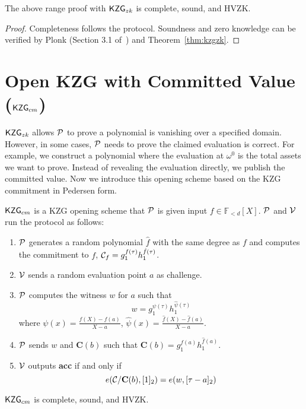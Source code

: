\begin{theorem}
The above range proof with $\mathsf{KZG}_{zk}$ is complete, sound, and HVZK.
\end{theorem}
\begin{proof}
Completeness follows the protocol. Soundness and zero knowledge can be verified by Plonk (Section 3.1 of~\cite{plonk}) and Theorem~\ref{thm:kzgzk}.
\end{proof}

\section{Open KZG with Committed Value ($\kzgcm$)}
\label{sec:kzgOpenComm}
$\mathsf{KZG}_{zk}$ allows $\mathcal{P}$ to prove a polynomial is vanishing over a specified domain. However, in some cases, $\mathcal{P}$ needs to prove the claimed evaluation is correct. For example, we construct a polynomial where the evaluation at $\omega^0$ is the total assets we want to prove. Instead of revealing the evaluation directly, we publish the committed value. Now we introduce this opening scheme based on the KZG commitment in Pedersen form.
\begin{definition}[$\kzgcm$]
$\kzgcm$ is a KZG opening scheme that $\mathcal{P}$ is given input $f\in\mathbb{F}_{<d}[X]$. $\mathcal{P}$ and $\mathcal{V}$ run the protocol as follows:
\begin{enumerate}
    \item $\mathcal{P}$ generates a random polynomial $\hat{f}$ with the same degree as $f$ and computes the commitment to $f$, $\mathcal{C}_f=g_1^{f(\tau)}h_1^{\hat{f}(\tau)}$.
    \item $\mathcal{V}$ sends a random evaluation point $a$ as challenge.
    \item $\mathcal{P}$ computes the witness $w$ for $a$ such that
    \[ w=g_1^{\psi(\tau)}h_1^{\hat\psi(\tau)} \]
    where $\psi(x)=\frac{f(X)-f(a)}{X-a}$, $\hat\psi(x)=\frac{\hat{f}(X)-\hat{f}(a)}{X-a}$.
    \item $\mathcal{P}$ sends $w$ and $\textbf{C}(b)$ such that $\textbf{C}(b)=g_1^{f(a)}h_1^{\hat{f}(a)}$.
    \item $\mathcal{V}$ outputs \textbf{acc} if and only if
    \[ e(\mathcal{C}/\textbf{C}(b),[1]_2)=e(w,[\tau-a]_2) \]
\end{enumerate}
\end{definition}
\begin{theorem}
\label{thm:kzgcm}
$\kzgcm$ is complete, sound, and HVZK.
\end{theorem}
